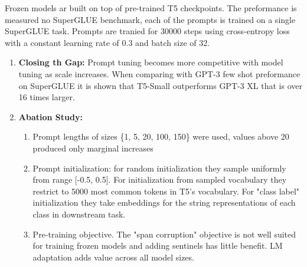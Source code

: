 \begin{enumerate}
    Frozen models ar built on top of pre-trained T5 checkpoints. The preformance is measured no SuperGLUE benchmark, each of the prompts is trained on a single SuperGLUE task. Prompts are tranied for 30000 steps using cross-entropy loss with a constant learning rate  of 0.3 and batch size of 32.
    \begin{enumerate}
        \item \textbf{Closing th Gap:} Prompt tuning becomes more competitive with model tuning as scale increases. When comparing with GPT-3 few shot preformance on SuperGLUE it is shown that T5-Small outperforms GPT-3 XL that is over 16 times larger.
        \item \textbf{Abation Study:}
        \begin{enumerate}
            \item Prompt lengths of sizes \{1, 5, 20, 100, 150\} were used, values above 20 produced only marginal increases
            \item Prompt initialization: for random initialization they sample uniformly from range [-0.5, 0.5]. For initialization from sampled vocabulary they restrict to 5000 most common tokens in T5's vocabulary. For "class label" initialization they take embeddings for the string representations of each class in downstream task. 
            \item Pre-training objective. The "span corruption" objective is not well suited for training frozen models and adding sentinels has little benefit. LM adaptation adds value across all model sizes.
        \end{enumerate}
    \end{enumerate}
\end{enumerate}
